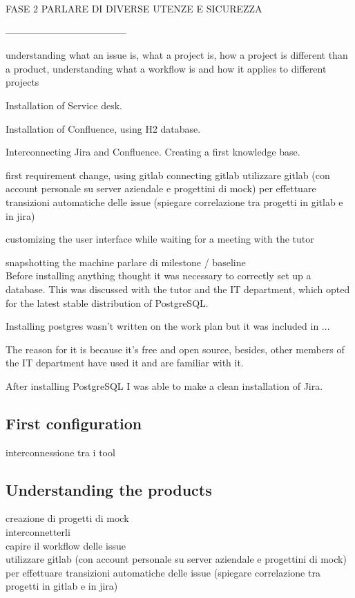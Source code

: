 	FASE 2 PARLARE DI DIVERSE UTENZE E SICUREZZA
	
	--------------------------------------
	
	understanding what an issue is, what a project is, how a project is different than a product, understanding what a workflow is and how it applies to different projects
	
	Installation of Service desk.
	
	Installation of Confluence, using H2 database.
	
	
	Interconnecting Jira and Confluence.
	Creating a first knowledge base.
	
	
	first requirement change, using gitlab
	connecting gitlab
	utilizzare gitlab (con account personale su server aziendale e progettini di mock) per effettuare transizioni automatiche delle issue (spiegare correlazione tra progetti in gitlab e in jira)
	
	customizing the user interface while waiting for a meeting with the tutor
	
	
	snapshotting the machine
	parlare di milestone / baseline\\
	
	
	
	
	Before installing anything thought it was necessary to correctly set up a database.
	This was discussed with the tutor and the IT department, which opted for the latest stable distribution of PostgreSQL.

	Installing postgres wasn't written on the work plan but it was included in ... 
	
	
	The reason for it is because it's free and open source, besides, other members of the IT department have used it and are familiar with it.
	
	After installing PostgreSQL I was able to make a clean installation of Jira.
	
	








	\subsection{First configuration}
		interconnessione tra i tool
	
	\subsection{Understanding the products}
		creazione di progetti di mock\\
		interconnetterli\\
		capire il workflow delle issue\\
		utilizzare gitlab (con account personale su server aziendale e progettini di mock) per effettuare transizioni automatiche delle issue (spiegare correlazione tra progetti in gitlab e in jira)

